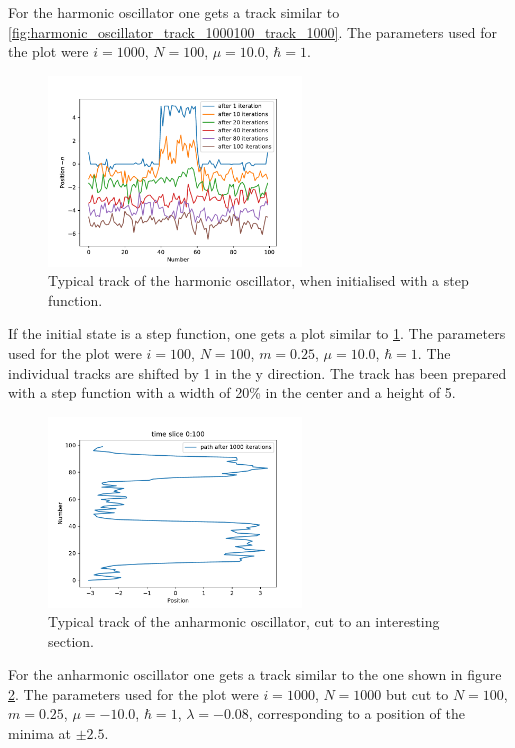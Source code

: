 \documentclass{scrartcl}
\begin{document}
		For the harmonic oscillator one gets a track similar to \ref{fig:harmonic_oscillator_track_1000100_track_1000}.
		The parameters used for the plot were $i=1000$, $N=100$, $\mu = 10.0$, $\hbar = 1$.
		\begin{figure}[H]
			\centering
				\includegraphics[width=0.6\textwidth]{../imgs/harmonic_oscillator_track/track_100100_step_track_shifted_double.pdf}
			\caption{Typical track of the harmonic oscillator, when initialised with a step function.}
			\label{fig:harmonic_oscillator_track_100100_100100_step_track_shifted_double}
		\end{figure}
		If the initial state is a step function, one gets a plot similar to \ref{fig:harmonic_oscillator_track_100100_100100_step_track_shifted_double}.
		The parameters used for the plot were $i=100$, $N=100$, $m=0.25$, $\mu = 10.0$, $\hbar = 1$.
		The individual tracks are shifted by 1 in the y direction.
		The track has been prepared with a step function with a width of 20\% in the center and a height of 5.
		\begin{figure}[H]
			\centering
				\includegraphics[width=0.6\textwidth]{../imgs/anharmonic_oscillator_track/track_100010005_track_pretty_1000.pdf}
			\caption{Typical track of the anharmonic oscillator, cut to an interesting section.}
			\label{fig:anharmonic_oscillator_track_100010005_track_pretty_1000}
		\end{figure}
		For the anharmonic oscillator one gets a track similar to the one shown in figure \ref{fig:anharmonic_oscillator_track_100010005_track_pretty_1000}.
		The parameters used for the plot were $i=1000$, $N=1000$ but cut to $N=100$, $m=0.25$, $\mu = -10.0$, $\hbar = 1$, $\lambda = -0.08$, corresponding to a position of the minima at $\pm 2.5$.
\end{document}

